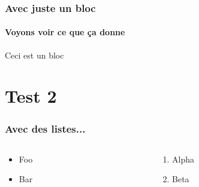 \documentclass[aspectratio=169, usepdftitle=false, xcolor={dvipsnames}, 9pt]{beamer}
\begin{document}
\begin{frame}[c]
    \frametitle{Avec juste un bloc}
    \framesubtitle{Voyons voir ce que ça donne}
    
    \begin{examples}[Test]
       Ceci est un bloc 
    \end{examples}
\end{frame}

\section{Test 2}

\begin{frame}[c]
    \frametitle{Avec des listes...}
    
    \begin{columns}
        \begin{column}{0.5\textwidth}
            \begin{itemize}
                \item Foo
                \item Bar
            \end{itemize}
        \end{column}
        \begin{column}{0.5\textwidth}
           \begin{enumerate}
               \item Alpha
               \item Beta
           \end{enumerate} 
        \end{column}
    \end{columns}
\end{frame}
\end{document}
